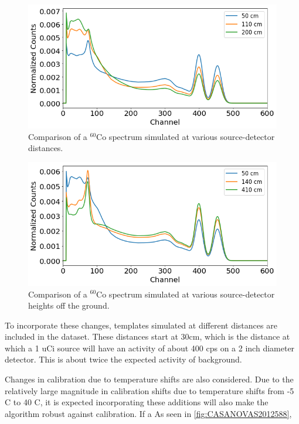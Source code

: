 \begin{figure}[H]
\centering
\includegraphics[width=0.95\linewidth]{images/sim_spectra_distance_comparison}
\caption{Comparison of a $^{60}$Co spectrum simulated at various source-detector distances.}
\label{fig:sim_spectra_distance_comparison}
\end{figure}

\begin{figure}[H]
\centering
\includegraphics[width=0.95\linewidth]{images/sim_spectra_height_comparison}
\caption{Comparison of a $^{60}$Co spectrum simulated at various source-detector heights off the ground.}
\label{fig:sim_spectra_height_comparison}
\end{figure}



To incorporate these changes, templates simulated at different distances are included in the dataset. These distances start at 30cm, which is the distance at which a 1 uCi source will have an activity of about 400 cps on a 2 inch diameter detector. This is about twice the expected activity of background. 

Changes in calibration due to temperature shifts are also considered. Due to the relatively large magnitude in calibration shifts due to temperature shifts from -5 C to 40 C, it is expected incorporating these additions will also make the algorithm robust against calibration. If a As seen in \ref{fig:CASANOVAS2012588}, 


